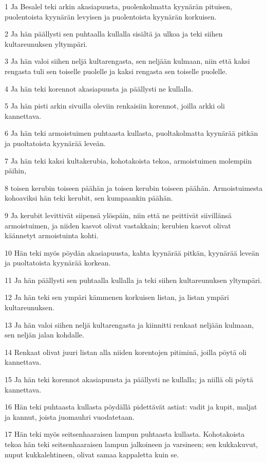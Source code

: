 \par 1 Ja Besalel teki arkin akasiapuusta, puolenkolmatta kyynärän pituisen, puolentoista kyynärän levyisen ja puolentoista kyynärän korkuisen.
\par 2 Ja hän päällysti sen puhtaalla kullalla sisältä ja ulkoa ja teki siihen kultareunuksen yltympäri.
\par 3 Ja hän valoi siihen neljä kultarengasta, sen neljään kulmaan, niin että kaksi rengasta tuli sen toiselle puolelle ja kaksi rengasta sen toiselle puolelle.
\par 4 Ja hän teki korennot akasiapuusta ja päällysti ne kullalla.
\par 5 Ja hän pisti arkin sivuilla oleviin renkaisiin korennot, joilla arkki oli kannettava.
\par 6 Ja hän teki armoistuimen puhtaasta kullasta, puoltakolmatta kyynärää pitkän ja puoltatoista kyynärää leveän.
\par 7 Ja hän teki kaksi kultakerubia, kohotakoista tekoa, armoistuimen molempiin päihin,
\par 8 toisen kerubin toiseen päähän ja toisen kerubin toiseen päähän. Armoistuimesta kohoaviksi hän teki kerubit, sen kumpaankin päähän.
\par 9 Ja kerubit levittivät siipensä ylöspäin, niin että ne peittivät siivillänsä armoistuimen, ja niiden kasvot olivat vastakkain; kerubien kasvot olivat käännetyt armoistuinta kohti.
\par 10 Hän teki myös pöydän akasiapuusta, kahta kyynärää pitkän, kyynärää leveän ja puoltatoista kyynärää korkean.
\par 11 Ja hän päällysti sen puhtaalla kullalla ja teki siihen kultareunuksen yltympäri.
\par 12 Ja hän teki sen ympäri kämmenen korkuisen listan, ja listan ympäri kultareunuksen.
\par 13 Ja hän valoi siihen neljä kultarengasta ja kiinnitti renkaat neljään kulmaan, sen neljän jalan kohdalle.
\par 14 Renkaat olivat juuri listan alla niiden korentojen pitiminä, joilla pöytä oli kannettava.
\par 15 Ja hän teki korennot akasiapuusta ja päällysti ne kullalla; ja niillä oli pöytä kannettava.
\par 16 Hän teki puhtaasta kullasta pöydällä pidettävät astiat: vadit ja kupit, maljat ja kannut, joista juomauhri vuodatetaan.
\par 17 Hän teki myös seitsenhaaraisen lampun puhtaasta kullasta. Kohotakoista tekoa hän teki seitsenhaaraisen lampun jalkoineen ja varsineen; sen kukkakuvut, nuput kukkalehtineen, olivat samaa kappaletta kuin se.
